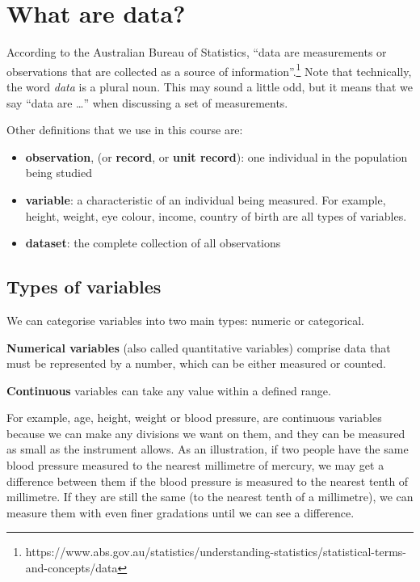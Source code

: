 \documentclass[
  a4paper,
]{memoir}
\providecommand{\tightlist}{%
  \setlength{\itemsep}{0pt}\setlength{\parskip}{0pt}}
\begin{document}
\section{What are data?}\label{what-are-data}

According to the Australian Bureau of Statistics, ``data are
measurements or observations that are collected as a source of
information''.\footnote{https://www.abs.gov.au/statistics/understanding-statistics/statistical-terms-and-concepts/data}
Note that technically, the word \emph{data} is a plural noun. This may
sound a little odd, but it means that we say ``data are \ldots{}'' when
discussing a set of measurements.

Other definitions that we use in this course are:

\begin{itemize}
\tightlist
\item
  \textbf{observation}, (or \textbf{record}, or \textbf{unit record}):
  one individual in the population being studied
\item
  \textbf{variable}: a characteristic of an individual being measured.
  For example, height, weight, eye colour, income, country of birth are
  all types of variables.
\item
  \textbf{dataset}: the complete collection of all observations
\end{itemize}

\subsection{Types of variables}\label{types-of-variables}

We can categorise variables into two main types: numeric or categorical.

\textbf{Numerical variables} (also called quantitative variables)
comprise data that must be represented by a number, which can be either
measured or counted.

\textbf{Continuous} variables can take any value within a defined range.

For example, age, height, weight or blood pressure, are continuous
variables because we can make any divisions we want on them, and they
can be measured as small as the instrument allows. As an illustration,
if two people have the same blood pressure measured to the nearest
millimetre of mercury, we may get a difference between them if the blood
pressure is measured to the nearest tenth of millimetre. If they are
still the same (to the nearest tenth of a millimetre), we can measure
them with even finer gradations until we can see a difference.
\end{document}
